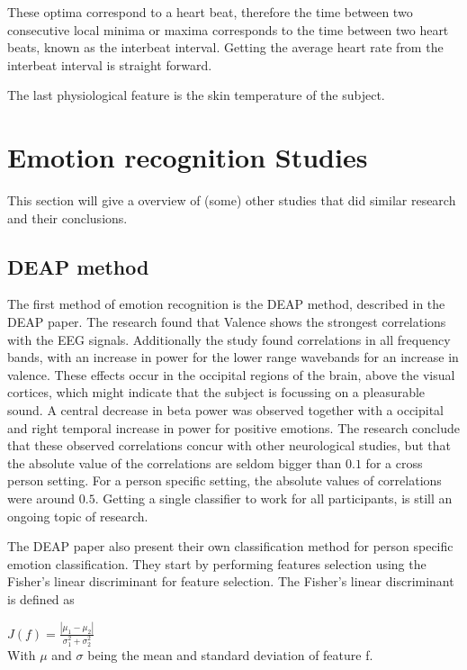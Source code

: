
\npar

These optima correspond to a heart beat, therefore the time between two consecutive local minima or maxima corresponds to the time between two heart beats, known as the interbeat interval. Getting the average heart rate from the interbeat interval is straight forward.

The last physiological feature is the skin temperature of the subject.

\section{Emotion recognition Studies}
This section will give a overview of (some) other studies that did similar research and their conclusions.

\subsection{DEAP method}
The first method of emotion recognition is the DEAP method, described in the DEAP paper\citep{DEAP}. The research found that Valence shows the strongest correlations with the EEG signals. Additionally the study found correlations in all frequency bands, with an increase in power for the lower range wavebands for an increase in valence. These effects occur in the occipital regions of the brain, above the visual cortices, which might indicate that the subject is focussing on a pleasurable sound. A central decrease in beta power was observed together with a occipital and right temporal increase in power for positive emotions. The research conclude that these observed correlations concur with other neurological studies, but that the absolute value of the correlations are seldom bigger than $0.1$ for a cross person setting. For a person specific setting, the absolute values of correlations were around $0.5$. Getting a single classifier to work for all participants, is still an ongoing topic of research.

\npar

The DEAP paper also present their own classification method for person specific emotion classification. They start by performing features selection using the Fisher's linear discriminant for feature selection. The Fisher's linear discriminant is defined as

\begin{center}
$J(f) = \frac{|\mu_1 - \mu_2|}{\sigma_1^2 + \sigma_2^2}$ \\
With $\mu$ and $\sigma$ being the mean and standard deviation of feature f.
\end{center}

